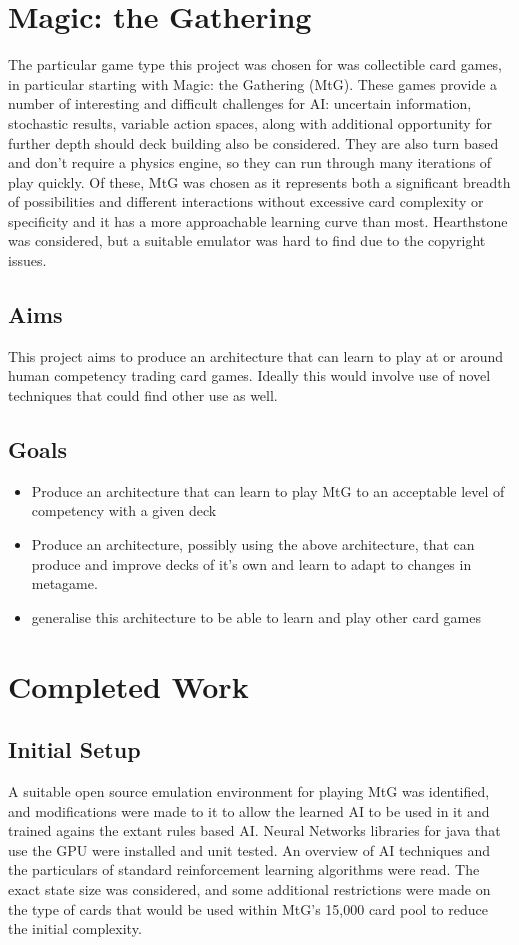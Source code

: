  \section{Magic: the Gathering}
  The particular game type this project was chosen for was collectible card games, in particular starting with Magic: the Gathering (MtG). These games provide a number of interesting and difficult challenges for AI: uncertain information, stochastic results, variable action spaces, along with additional opportunity for further depth should deck building also be considered. They are also turn based and don't require a physics engine, so they can run through many iterations of play quickly. Of these, MtG was chosen as it represents both a significant breadth of possibilities and different interactions without excessive card complexity or specificity and it has a more approachable learning curve than most. Hearthstone was considered, but a suitable emulator was hard to find due to the copyright issues. 
  \subsection{Aims}
  This project aims to produce an architecture that can learn to play at or around human competency trading card games. Ideally this would involve use of novel techniques that could find other use as well.
  \subsection{Goals}
  \begin{itemize}
    \item Produce an architecture that can learn to play MtG to an acceptable level of competency with a given deck
    \item Produce an architecture, possibly using the above architecture, that can produce and improve decks of it's own and learn to adapt to changes in metagame.
    \item generalise this architecture to be able to learn and play other card games
  \end{itemize}
  \section{Completed Work}
    \subsection{Initial Setup}
      A suitable open source emulation environment for playing MtG was identified, and modifications were made to it to allow the learned AI to be used in it and trained agains the extant rules based AI. Neural Networks libraries for java that use the GPU were installed and unit tested. An overview of AI techniques and the particulars of standard reinforcement learning algorithms were read. The exact state size was considered, and some additional restrictions were made on the type of cards that would be used within MtG's 15,000 card pool to reduce the initial complexity.
